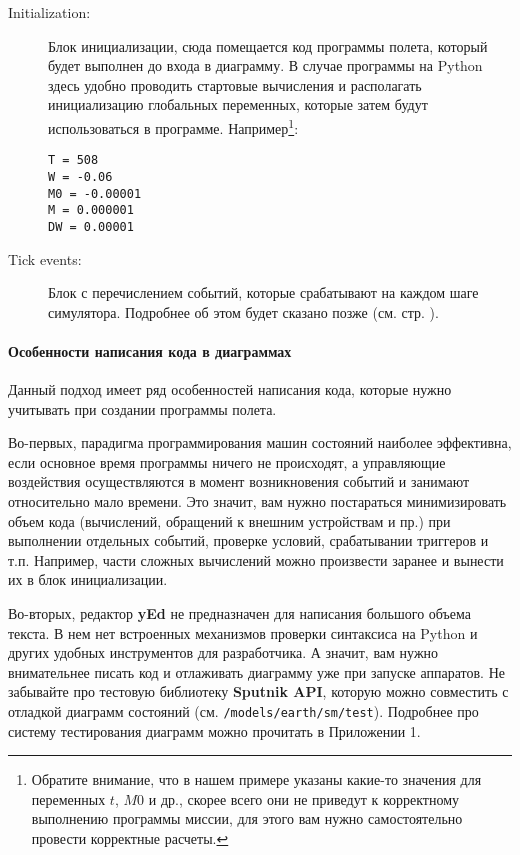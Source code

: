 \documentclass[12pt,a4paper]{article}
\begin{document}
\begin{description}
\item[Initialization:] Блок инициализации, сюда помещается код программы полета,
  который будет выполнен до входа в диаграмму. В случае программы на Python здесь удобно
  проводить стартовые вычисления и располагать инициализацию глобальных переменных,
  которые затем будут использоваться в программе. Например\footnote{Обратите внимание, что в нашем
    примере указаны какие-то значения для переменных $t$, $M0$ и др., скорее всего они не
    приведут к корректному выполнению программы миссии, для этого вам нужно самостоятельно
    провести корректные расчеты.}:

\begin{verbatim}
T = 508
W = -0.06
M0 = -0.00001
M = 0.000001
DW = 0.00001
\end{verbatim}

\item[Tick events:] Блок с перечислением событий, которые срабатывают на каждом
  шаге симулятора. Подробнее об этом будет сказано позже (см. стр. \pageref{TICK_EVENTS}).
\end{description}

\paragraph{Особенности написания кода в диаграммах} Данный подход имеет ряд особенностей
написания кода, которые нужно учитывать при создании программы полета.

Во-первых, парадигма программирования машин состояний наиболее эффективна, если основное
время программы ничего не происходят, а управляющие воздействия осуществляются в момент
возникновения событий и занимают относительно мало времени. Это значит, вам нужно
постараться минимизировать объем кода (вычислений, обращений к внешним устройствам и пр.)
при выполнении отдельных событий, проверке условий, срабатывании триггеров и
т.п. Например, части сложных вычислений можно произвести заранее и вынести их в блок
инициализации.

Во-вторых, редактор \textbf{yEd} не предназначен для написания большого объема текста. В нем нет
встроенных механизмов проверки синтаксиса на Python и других удобных инструментов для
разработчика. А значит, вам нужно внимательнее писать код и отлаживать диаграмму уже  при
запуске аппаратов. Не забывайте про тестовую библиотеку \textbf{Sputnik API}, которую
можно совместить с отладкой диаграмм состояний
(см. \verb'/models/earth/sm/test'). Подробнее про систему тестирования диаграмм можно
прочитать в Приложении 1.
\end{document}
